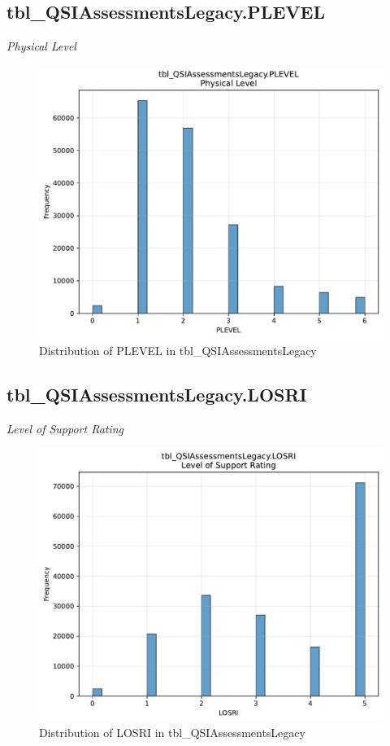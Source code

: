\subsection{tbl\_QSIAssessmentsLegacy.PLEVEL}
\textit{Physical Level}

\begin{figure}[htbp]
\centering
\includegraphics[width=\textwidth]{figures/dbo_tbl_QSIAssessmentsLegacy_PLEVEL.pdf}
\caption{Distribution of PLEVEL in tbl\_QSIAssessmentsLegacy}
\end{figure}\newpage

\subsection{tbl\_QSIAssessmentsLegacy.LOSRI}
\textit{Level of Support Rating}

\begin{figure}[htbp]
\centering
\includegraphics[width=\textwidth]{figures/dbo_tbl_QSIAssessmentsLegacy_LOSRI.pdf}
\caption{Distribution of LOSRI in tbl\_QSIAssessmentsLegacy}
\end{figure}\newpage

